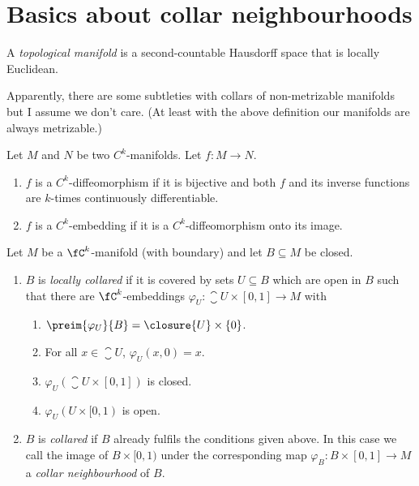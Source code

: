 \section{Basics about collar neighbourhoods}
\label{sec:mathsdef}

\begin{defi}
    A \emph{topological manifold} is a second-countable Hausdorff space that is locally Euclidean.
\end{defi}

\begin{rem}
    Apparently, there are some subtleties with collars of non-metrizable manifolds but I assume we don't care. (At least with the above definition our manifolds are always metrizable.)
\end{rem}

\begin{defi}
    Let $M$ and $N$ be two $C^k$-manifolds. 
    Let $f \colon M \to N$. 
    \begin{enumerate}
        \item $f$ is a $C^k$-diffeomorphism if it is bijective and both $f$ and its inverse functions are $k$-times continuously differentiable. 
        \item $f$ is a $C^k$-embedding if it is a $C^k$-diffeomorphism onto its image.
    \end{enumerate}
\end{defi}

\begin{defi}\label{defi:collared}
    Let $M$ be a $\fC^k$-manifold (with boundary) and let $B \subseteq M$ be closed. 
    \begin{enumerate}\label{defi:collared:local}
        \item $B$ is \emph{locally collared} if it is covered by sets $U \subseteq B$ which are open in $B$ such that there are $\fC^k$-embeddings $\varphi_U \colon \closure{U} \times [0, 1] \to M$ with 
        \begin{enumerate}
            \item $\preim{\varphi_U}{B} = \closure{U} \times \{ 0\}$.
            \item For all $x \in \closure{U}$, $\varphi_U (x, 0) = x$.
            \item $\varphi_U (\closure{U} \times [0, 1])$ is closed. 
            \item $\varphi_U (U \times [0, 1)$ is open.  
        \end{enumerate}
        \item $B$ is \emph{collared} if $B$ already fulfils the conditions given above. In this case we call the image of $B \times [0, 1)$ under the corresponding map $\varphi_B \colon B \times [0, 1] \to M$ a \emph{collar neighbourhood} of $B$.
    \end{enumerate}
\end{defi}

